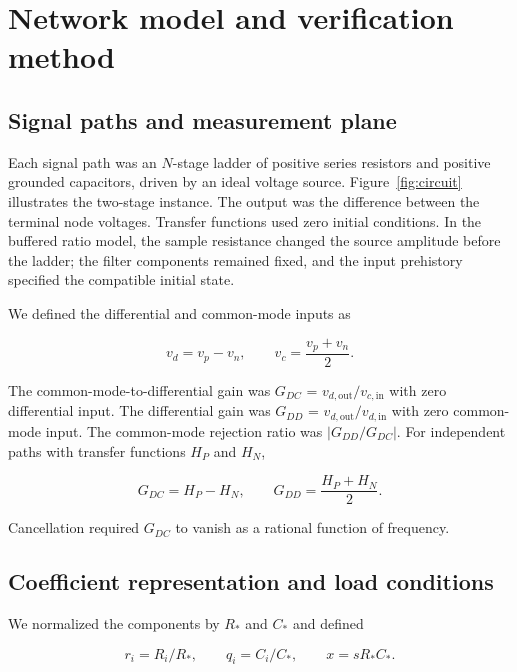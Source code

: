 \section{Network model and verification method}

\subsection{Signal paths and measurement plane}
\label{sec:model-plane}

Each signal path was an $N$-stage ladder of positive series resistors and positive grounded capacitors, driven by an ideal voltage source. Figure~\ref{fig:circuit} illustrates the two-stage instance. The output was the difference between the terminal node voltages. Transfer functions used zero initial conditions. In the buffered ratio model, the sample resistance changed the source amplitude before the ladder; the filter components remained fixed, and the input prehistory specified the compatible initial state.

We defined the differential and common-mode inputs as

\begin{equation}\label{eq:1}
v_d=v_p-v_n,\qquad v_c=\frac{v_p+v_n}{2}.
\end{equation}

The common-mode-to-differential gain was \(G_{DC}\) = \(v_{d,\mathrm{out}}/v_{c,\mathrm{in}}\) with zero differential input. The differential gain was \(G_{DD}\) = \(v_{d,\mathrm{out}}/v_{d,\mathrm{in}}\) with zero common-mode input. The common-mode rejection ratio was \(\lvert G_{DD}/G_{DC}\rvert\). For independent paths with transfer functions \(H_P\) and \(H_N\),

\begin{equation}\label{eq:2}
G_{DC}=H_P-H_N,\qquad
G_{DD}=\frac{H_P+H_N}{2}.
\end{equation}

Cancellation required \(G_{DC}\) to vanish as a rational function of frequency.



\subsection{Coefficient representation and load conditions}
\label{sec:coefficients}

We normalized the components by \(R_*\) and \(C_*\) and defined

\begin{equation}\label{eq:3}
r_i=R_i/R_*,\qquad q_i=C_i/C_*,\qquad x=sR_*C_*.
\end{equation}

